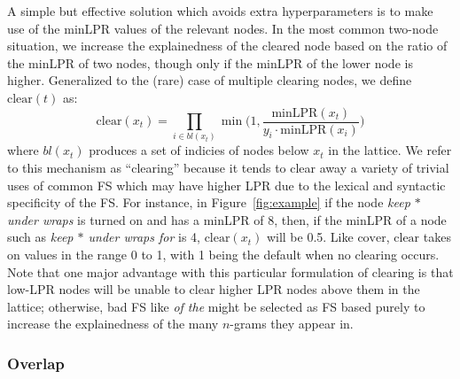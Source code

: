 \documentclass[11pt,letterpaper]{article}
\newcommand{\gap}{$*$\xspace}
\newcommand{\ex}[1]{\textit{#1}\xspace}
\newcommand{\minLPR}{\ensuremath{\text{minLPR}}}
\newcommand{\cover}{\ensuremath{\text{cover}}\xspace}
\newcommand{\clear}{\ensuremath{\text{clear}}\xspace}
\newcommand{\figref}[2][]{Figure#1~\ref{#2}\xspace}
\begin{document}
A simple but effective solution which avoids extra hyperparameters is to make use of the minLPR values of the relevant nodes. In the most common two-node situation, we increase the explainedness of the cleared node based on the ratio of the minLPR of two nodes, though only if the minLPR of the lower node is higher. Generalized to the (rare) case of multiple clearing nodes, we define $\clear(t)$ as:
\begin{displaymath}
\clear(x_t) = \prod_{i \in bl(x_t)}{\min\Big(1,\frac{\minLPR(x_t)}{y_i\cdot\minLPR(x_i)}\Big)}
\end{displaymath}
where $bl(x_t)$ produces a set of indicies of nodes below $x_t$ in the lattice. We refer to this mechanism as ``clearing'' because it tends to clear away a variety of trivial uses of common FS which may have higher LPR due to the lexical and syntactic specificity of the FS. For instance, in \figref{fig:example} if the node \ex{keep \gap under wraps}  is turned on and has a minLPR of 8, then, if the minLPR of a node such as \ex{keep \gap under wraps for} is 4, $\clear(x_t)$ will be 0.5. Like \cover, \clear takes on values in the range 0 to 1, with 1 being the default when no clearing occurs. Note that one major advantage with this particular formulation of clearing is that low-LPR nodes will be unable to clear higher LPR nodes above them in the lattice; otherwise, bad FS like \ex{of the} might be selected as FS based purely to increase the explainedness of the many $n$-grams they appear in.



\subsubsection{Overlap}
\end{document}
